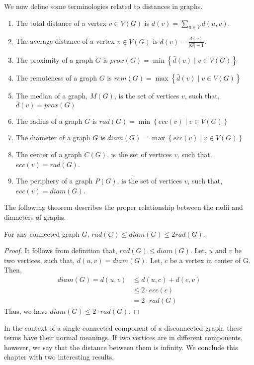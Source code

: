 \documentclass[../basic_graph_theory.tex]{subfiles}
\begin{document}
We now define some terminologies related to distances in graphs.
\begin{enumerate}
    \item The total distance of a vertex $v \in V(G)$ is $d(v)=\sum_{u \in V} d(u,v)$.
    \item The average distance of a vertex $v \in V(G)$ is $\bar{d}(v)=\frac{d(v)}{|G|-1}$.
    \item The proximity of a graph $G$ is $prox(G) = \min \left\{\bar{d}(v) \mid v \in V(G) \right\}$
    \item The remoteness of a graph $G$ is $rem(G) = \max \left\{\bar{d}(v) \mid v \in V(G) \right\}$
    \item The median of a graph, $M(G)$, is the set of vertices $v$, such that, $\bar{d}(v)=prox(G)$
    \item The radius of a graph $G$ is $rad(G) = \min \left\{ ecc(v) \mid v \in V(G) \right\}$
    \item The diameter of a graph $G$ is $diam(G) = \max \left\{ ecc(v) \mid v \in V(G) \right\}$
    \item The center of a graph $C(G)$, is the set of vertices $v$, such that, $ecc(v)=rad(G)$.
    \item The periphery of a graph $P(G)$, is the set of vertices $v$, such that, $ecc(v)=diam(G)$.
\end{enumerate}

The following theorem describes the proper relationship between the radii and
diameters of graphs.

\begin{thm}
    For any connected graph $G$, $rad(G) \le diam(G) \le 2rad(G)$.
\end{thm}
\begin{proof}
    It follows from definition that, $rad(G) \le diam(G)$. Let, $u$ and $v$ be two vertices, such that, $d(u,v)=diam(G)$. Let, $c$ be a vertex in center of G. Then,
    \begin{align*}
        diam(G) = d(u,v)
         & \le d(u,c)+d(c,v) \\
         & \le 2\cdot ecc(c) \\
         & = 2\cdot rad(G)
    \end{align*}
    Thus, we have $diam(G) \le 2\cdot rad(G)$.
\end{proof}

In the context of a single connected component of a disconnected graph, these terms have their normal meanings. If two vertices are in different components, however, we say that the distance between them is infinity. We conclude this chapter with two interesting results.
\end{document}
